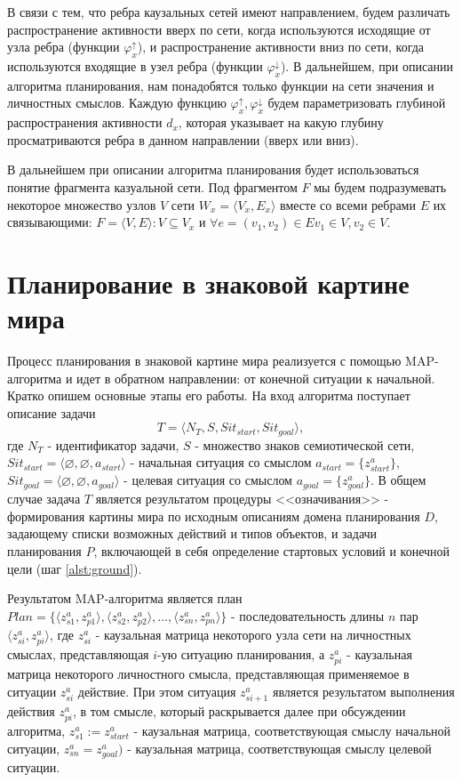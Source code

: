 \documentclass[12pt]{scrartcl}
\begin{document}
	В связи с тем, что ребра каузальных сетей имеют направлением, будем различать распространение активности вверх по сети, когда используются исходящие от узла ребра (функции $\varphi_x^\uparrow$), и распространение активности вниз по сети, когда используются входящие в узел ребра (функции $\varphi_x^\downarrow$). В дальнейшем, при описании алгоритма планирования, нам понадобятся только функции на сети значения и личностных смыслов. Каждую функцию $\varphi_x^\uparrow,\varphi_x^\downarrow$ будем параметризовать глубиной распространения активности $d_x$, которая указывает на какую глубину просматриваются ребра в данном направлении (вверх или вниз).
		
	В дальнейшем при описании алгоритма планирования будет использоваться понятие фрагмента казуальной сети. Под фрагментом $F$ мы будем подразумевать некоторое множество узлов $V$ сети $W_x=\langle V_x,E_x\rangle$ вместе со всеми ребрами $E$ их связывающими: $F=\langle V,E\rangle: V\subseteq V_x$ и $\forall e=(v_1,v_2)\in E v_1\in V, v_2\in V$.
	
	\section{Планирование в знаковой картине мира}\label{sec:plan}
	
	Процесс планирования в знаковой картине мира реализуется с помощью MAP-алгоритма и идет в обратном направлении: от конечной ситуации к начальной. Кратко опишем основные этапы его работы. На вход алгоритма поступает описание задачи 
	\[T = \langle N_T,S,Sit_{start}, Sit_{goal}\rangle,\]
	где $N_T$ - идентификатор задачи, $S$ - множество знаков семиотической сети, $Sit_{start}=\langle \varnothing, \varnothing, a_{start} \rangle$ - начальная ситуация со смыслом $a_{start}=\{z_{start}^a\}$, $Sit_{goal}=\langle \varnothing, \varnothing, a_{goal} \rangle$ - целевая ситуация со смыслом $a_{goal}=\{z_{goal}^a\}$. В общем случае задача $T$ является результатом процедуры <<означивания>> - формирования картины мира по исходным описаниям домена планирования $D$, задающему списки возможных действий и типов объектов, и задачи планирования $P$, включающей в себя определение стартовых условий и конечной цели (шаг \ref{alst:ground}).

	Результатом MAP-алгоритма является план $Plan=\{\langle z_{s1}^a,z_{p1}^a\rangle, \langle z_{s2}^a,z_{p2}^a\rangle,\dots, \langle z_{sn}^a,z_{pn}^a\rangle\}$ - последовательность длины $n$ пар $\langle z_{si}^a,z_{pi}^a\rangle$, где $z_{si}^a$ - каузальная матрица некоторого узла сети на личностных смыслах, представляющая $i$-ую ситуацию планирования, а $z_{pi}^a$ - каузальная матрица некоторого личностного смысла, представляющая применяемое в ситуации $z_{si}^a$ действие. При этом ситуация $z_{si+1}^a$ является результатом выполнения действия $z_{pi}^a$, в том смысле, который раскрывается далее при обсуждении алгоритма, $z_{s1}^a := z_{start}^a$ - каузальная матрица, соответствующая смыслу начальной ситуации, $z_{sn}^a=z_{goal}^a)$ - каузальная матрица, соответствующая смыслу целевой ситуации.
\end{document}
